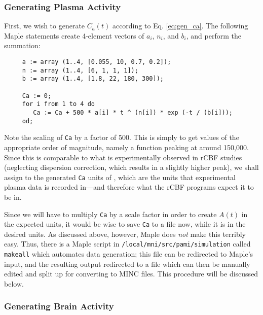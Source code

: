 \subsubsection{Generating Plasma Activity}

First, we wish to generate $C_{a}(t)$ according to Eq. \ref{eq:gen_ca}.  The
following Maple statements create 4-element vectors of $a_{i}$, $n_{i}$, and
$b_{i}$, and perform the summation:

\begin{verbatim}
     a := array (1..4, [0.055, 10, 0.7, 0.2]);
     n := array (1..4, [6, 1, 1, 1]);
     b := array (1..4, [1.8, 22, 180, 300]);

     Ca := 0;
     for i from 1 to 4 do
        Ca := Ca + 500 * a[i] * t ^ (n[i]) * exp (-t / (b[i]));
     od;
\end{verbatim}

Note the scaling of \verb|Ca| by a factor of 500.  This is simply to
get values of the appropriate order of magnitude, namely a function
peaking at around 150,000.  Since this is comparable to what is
experimentally observed in rCBF studies (neglecting dispersion
correction, which results in a slightly higher peak), we shall assign to the
generated \verb|Ca| units of ,
which are the units that experimental plasma data is recorded in---and
therefore what the rCBF programs expect it to be in.

Since we will have to multiply \verb|Ca| by a scale factor in order to
create $A(t)$ in the expected units, it would be wise to save
\verb|Ca| to a file now, while it is in the desired units.  As
discussed above, however, Maple does {\em not} make this terribly
easy.  Thus, there is a Maple script in
\verb|/local/mni/src/pami/simulation| called \verb|makeall| which
automates data generation; this file can be redirected to Maple's
input, and the resulting output redirected to a file which can then be
manually edited and split up for converting to MINC files.  This
procedure will be discussed below.

\subsubsection{Generating Brain Activity}

